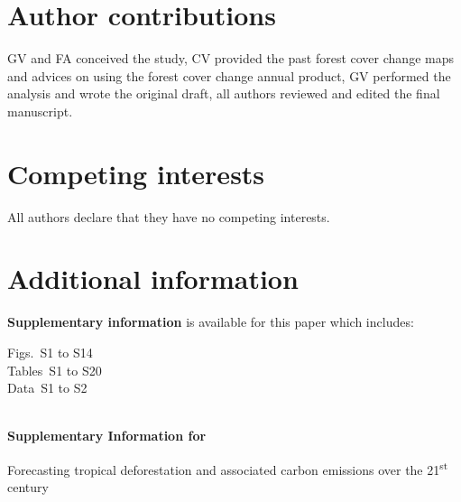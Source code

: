 \documentclass[
  12pt,
]{article}
\begin{document}
\section{Author contributions}

GV and FA conceived the study, CV provided the past forest cover change maps and advices on using the forest cover change annual product, GV performed the analysis and wrote the original draft, all authors reviewed and edited the final manuscript.

\section{Competing interests}

All authors declare that they have no competing interests.

\section{Additional information}

\textbf{Supplementary information} is available for this paper which includes:

\noindent Figs.~S1 to S14\\
Tables~S1 to S20\\
Data~S1 to S2\\


\nolinenumbers
\newpage
  
\renewcommand{\thetable}{S\arabic{table}}
\renewcommand{\thefigure}{S\arabic{figure}}
\renewcommand{\theequation}{S\arabic{equation}}
\setcounter{figure}{0}
\setcounter{table}{0}

\begin{center}
  ~\\%
  \vspace{0.5cm}
  \Large{\textbf{Supplementary Information for}}
\end{center}

\vspace{1cm}

\begin{center}
  \LARGE{Forecasting tropical deforestation and associated carbon emissions over the 21\textsuperscript{st} century}
\end{center}
\end{document}

